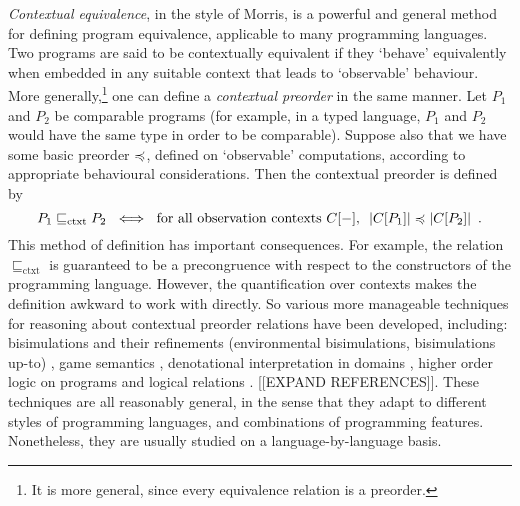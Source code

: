 \emph{Contextual equivalence}, in the style of Morris,
is a powerful and general method for defining program equivalence, applicable to many 
programming languages. 
Two programs are said to be contextually equivalent if 
they `behave' equivalently when embedded in any suitable context that leads to `observable' behaviour. 
More generally,\footnote{It is more general, since every equivalence relation is a preorder.} one can define a \emph{contextual preorder} in the same manner. Let $P_1$ and $P_2$ be comparable programs (for example, in a typed language, $P_1$ and $P_2$ would  have the same type in order to be comparable). Suppose also that we have some {basic preorder} $\preccurlyeq$, defined on `observable' computations, according to appropriate behavioural considerations. Then the contextual preorder is defined by
\begin{equation}
\label{equation:contextual-preorder}
P_1 \sqsubseteq_\text{ctxt} P_2 ~ \iff ~
\text{for all observation contexts $C[-]$, $~ |C[P_1]| \preccurlyeq |C[P_2]|$} \enspace . 
\end{equation}
This method of definition has important consequences. For example, the relation
$\sqsubseteq_\text{ctxt}$ is guaranteed to be a precongruence with respect 
to the constructors of the programming language.
However, the quantification over contexts makes the definition awkward to work with directly.
So various more manageable techniques for reasoning about contextual preorder relations have been developed, including:
 bisimulations 
and their refinements (environmental bisimulations, 
bisimulations up-to) \cite{koutavas2011applicative}, 
game semantics \cite{abramsky1999game}, 
denotational interpretation in domains \cite{scott1982domains}, 
higher order logic on 
programs \cite{honda2005observationally} 
and logical relations \cite{Pitts2000}. [[EXPAND REFERENCES]].
These techniques are all reasonably general, in the sense that they adapt to different styles of programming languages, and combinations of programming features. Nonetheless, they are usually studied on a language-by-language basis.


